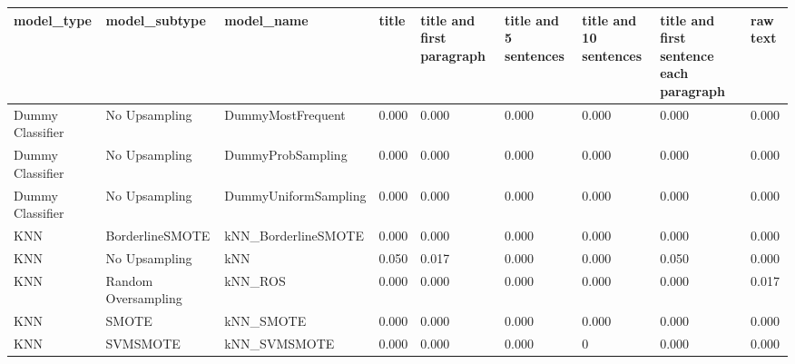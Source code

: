 \begin{tabular}{lllllllll}
\toprule
                  model\_type &       model\_subtype &                                   model\_name & title & title and first paragraph & title and 5 sentences & title and 10 sentences & title and first sentence each paragraph & raw text \\
\midrule
            Dummy Classifier &       No Upsampling &                            DummyMostFrequent & 0.000 &                     0.000 &                 0.000 &                  0.000 &                                   0.000 &    0.000 \\
            Dummy Classifier &       No Upsampling &                            DummyProbSampling & 0.000 &                     0.000 &                 0.000 &                  0.000 &                                   0.000 &    0.000 \\
            Dummy Classifier &       No Upsampling &                         DummyUniformSampling & 0.000 &                     0.000 &                 0.000 &                  0.000 &                                   0.000 &    0.000 \\
                         KNN &     BorderlineSMOTE &                          kNN\_BorderlineSMOTE & 0.000 &                     0.000 &                 0.000 &                  0.000 &                                   0.000 &    0.000 \\
                         KNN &       No Upsampling &                                          kNN & 0.050 &                     0.017 &                 0.000 &                  0.000 &                                   0.050 &    0.000 \\
                         KNN & Random Oversampling &                                      kNN\_ROS & 0.000 &                     0.000 &                 0.000 &                  0.000 &                                   0.000 &    0.017 \\
                         KNN &               SMOTE &                                    kNN\_SMOTE & 0.000 &                     0.000 &                 0.000 &                  0.000 &                                   0.000 &    0.000 \\
                         KNN &            SVMSMOTE &                                 kNN\_SVMSMOTE & 0.000 &                     0.000 &                 0.000 &                      0 &                                   0.000 &    0.000 \\

\end{tabular}

